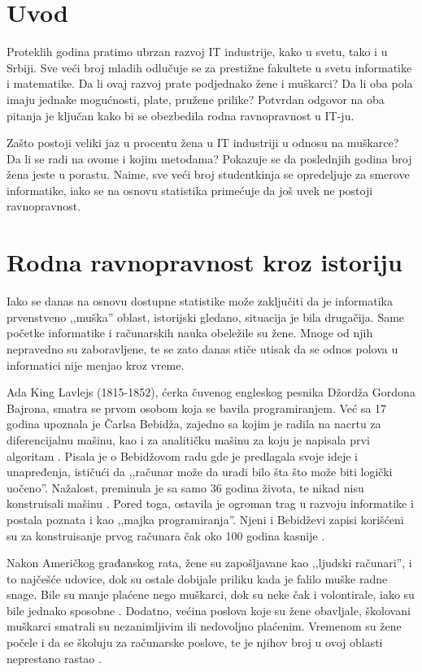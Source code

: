 \section{Uvod}
\label{sec:uvod}
Proteklih godina pratimo ubrzan razvoj IT industrije, kako u svetu, tako i u Srbiji. Sve veći broj mladih odlučuje se za prestižne fakultete u svetu informatike i matematike. Da li ovaj razvoj prate podjednako žene i muškarci? Da li oba pola imaju jednake mogućnosti, plate, pružene prilike? Potvrdan odgovor na oba pitanja je ključan kako bi se obezbedila rodna ravnopravnost u IT-ju.

Zašto postoji veliki jaz u procentu žena u IT industriji u odnosu na muškarce? Da li se radi na ovome i kojim metodama? Pokazuje se da poslednjih godina broj žena jeste u porastu. Naime, sve veći broj studentkinja se opredeljuje za smerove informatike, iako se na osnovu statistika primećuje da još uvek ne postoji ravnopravnost.

\section{Rodna ravnopravnost kroz istoriju}
\label{sec:istorija}
Iako se danas na osnovu dostupne statistike može zaključiti da je informatika prvenstveno ,,muška'' oblast, istorijski gledano, situacija je bila drugačija. Same početke informatike i računarskih nauka obeležile su žene. Mnoge od njih nepravedno su zaboravljene, te se zato danas stiče utisak da se odnos polova u informatici nije menjao kroz vreme.

Ada King Lavlejs (1815-1852), ćerka čuvenog engleskog pesnika Džordža Gordona Bajrona, smatra se prvom osobom koja se bavila programiranjem. Već sa 17 godina upoznala je Čarlsa Bebidža, zajedno sa kojim je radila na nacrtu za diferencijalnu mašinu, kao i za analitičku mašinu za koju je napisala prvi algoritam \cite{brockwell}. Pisala je o Bebidžovom radu gde je predlagala svoje ideje i unapređenja, ističući da ,,računar može da uradi bilo šta što može biti logički uočeno''. Nažalost, preminula je sa samo 36 godina života, te nikad nisu konstruisali mašinu \cite{davis}. Pored toga, ostavila je ogroman trag u razvoju informatike i postala poznata i kao ,,majka programiranja''. Njeni i Bebidževi zapisi korišćeni su za konstruisanje prvog računara čak oko 100 godina kasnije \cite{npr, fuegi}.

Nakon Američkog građanskog rata, žene su zapošljavane kao ,,ljudski računari'', i to najčešće udovice, dok su ostale dobijale priliku kada je falilo muške radne snage. Bile su manje plaćene nego muškarci, dok su neke čak i volontirale, iako su bile jednako sposobne \cite{evans}. Dodatno, većina poslova koje su žene obavljale, školovani muškarci smatrali su nezanimljivim ili nedovoljno plaćenim. Vremenom su žene počele i da se školuju za računarske poslove, te je njihov broj u ovoj oblasti neprestano rastao \cite{sobel}.

